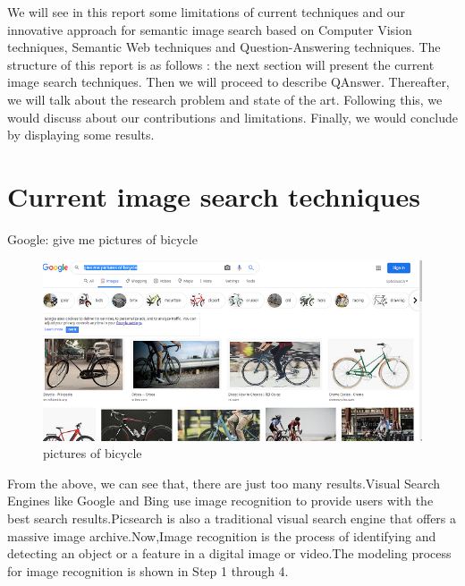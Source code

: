 \documentclass[12pt]{article}
\begin{document}
We will see in this report some limitations of current techniques and
our innovative approach for semantic image search based on Computer Vision
techniques, Semantic Web techniques and Question-Answering techniques.
The structure of this report is as follows : the next section will
present the current image search techniques. Then we will proceed to describe QAnswer. Thereafter, we will talk about the research problem and state of the art. Following this, we would discuss about our contributions and limitations. Finally, we would conclude by displaying some results.

\section{Current image search techniques}
Google: give me pictures of bicycle
\begin{figure}[!h]
\includegraphics{googleBicycle.png}
\caption{pictures of bicycle}
\end{figure}
\newline
From the above, we can see that, there are just too many results.Visual Search Engines like Google and Bing use image recognition to provide users with the best search results.Picsearch is also a traditional visual search engine that offers a massive image archive\cite{imageRecognitionIntro}.Now,Image recognition is the process of identifying and detecting an object or a feature in a digital image or video\cite{imageRecognitionDef}.The modeling process for image recognition is shown in Step 1 through 4.\\
\end{document}
